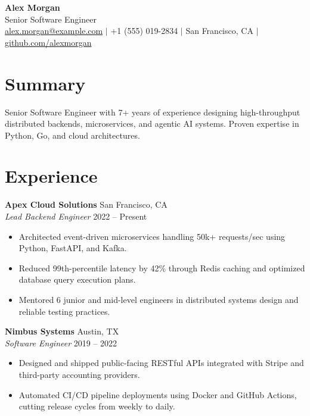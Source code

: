 \documentclass[10pt,a4paper]{article}
\begin{document}
\begin{center}
    {\Huge \textbf{Alex Morgan}}\\[4pt]
    {\large Senior Software Engineer}\\[4pt]
    \href{mailto:alex.morgan@example.com}{alex.morgan@example.com} $\vert$ +1 (555) 019-2834 $\vert$ San Francisco, CA $\vert$ \href{https://github.com/alexmorgan}{github.com/alexmorgan}
\end{center}

\vspace{4pt}

\section{Summary}
Senior Software Engineer with 7+ years of experience designing high-throughput distributed backends, microservices, and agentic AI systems. Proven expertise in Python, Go, and cloud architectures.

\section{Experience}
\textbf{Apex Cloud Solutions} \hfill San Francisco, CA\\
\textit{Lead Backend Engineer} \hfill 2022 -- Present
\begin{itemize}
    \item Architected event-driven microservices handling 50k+ requests/sec using Python, FastAPI, and Kafka.
    \item Reduced 99th-percentile latency by 42\% through Redis caching and optimized database query execution plans.
    \item Mentored 6 junior and mid-level engineers in distributed systems design and reliable testing practices.
\end{itemize}

\vspace{6pt}

\textbf{Nimbus Systems} \hfill Austin, TX\\
\textit{Software Engineer} \hfill 2019 -- 2022
\begin{itemize}
    \item Designed and shipped public-facing RESTful APIs integrated with Stripe and third-party accounting providers.
    \item Automated CI/CD pipeline deployments using Docker and GitHub Actions, cutting release cycles from weekly to daily.
\end{itemize}
\end{document}
